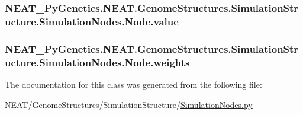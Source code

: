 \subsubsection[{\texorpdfstring{value}{value}}]{\setlength{\rightskip}{0pt plus 5cm}N\+E\+A\+T\+\_\+\+Py\+Genetics.\+N\+E\+A\+T.\+Genome\+Structures.\+Simulation\+Structure.\+Simulation\+Nodes.\+Node.\+value}\hypertarget{classNEAT__PyGenetics_1_1NEAT_1_1GenomeStructures_1_1SimulationStructure_1_1SimulationNodes_1_1Node_af25b687b957169788a4190545d6dd90c}{}\label{classNEAT__PyGenetics_1_1NEAT_1_1GenomeStructures_1_1SimulationStructure_1_1SimulationNodes_1_1Node_af25b687b957169788a4190545d6dd90c}
\subsubsection[{\texorpdfstring{weights}{weights}}]{\setlength{\rightskip}{0pt plus 5cm}N\+E\+A\+T\+\_\+\+Py\+Genetics.\+N\+E\+A\+T.\+Genome\+Structures.\+Simulation\+Structure.\+Simulation\+Nodes.\+Node.\+weights}\hypertarget{classNEAT__PyGenetics_1_1NEAT_1_1GenomeStructures_1_1SimulationStructure_1_1SimulationNodes_1_1Node_a0e8535438a367cd12a2eb47dee280f36}{}\label{classNEAT__PyGenetics_1_1NEAT_1_1GenomeStructures_1_1SimulationStructure_1_1SimulationNodes_1_1Node_a0e8535438a367cd12a2eb47dee280f36}


The documentation for this class was generated from the following file\+:\begin{DoxyCompactItemize}
\item 
N\+E\+A\+T/\+Genome\+Structures/\+Simulation\+Structure/\hyperlink{SimulationNodes_8py}{Simulation\+Nodes.\+py}\end{DoxyCompactItemize}
